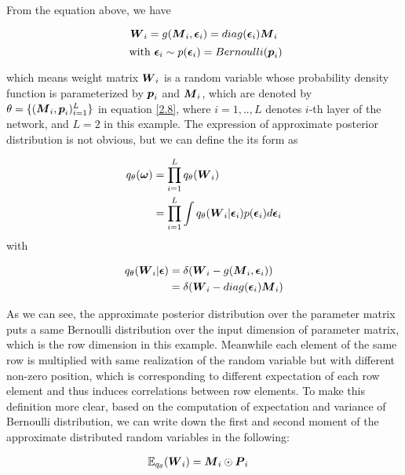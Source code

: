 From the equation above, we have 

\[
\boldsymbol W_{i} = g(\boldsymbol M_{i}, \boldsymbol \epsilon_{i})= diag(\boldsymbol \epsilon_{i}) \boldsymbol M_{i} 
\]
\[ 
\text{ with } \boldsymbol \epsilon_{i} \sim p(\boldsymbol \epsilon_{i}) = Bernoulli(\boldsymbol p_{i}) 
\]

which means weight matrix $\boldsymbol W_{i}$ is a random variable whose probability density function is parameterized by $\boldsymbol p_{i}$ and $\boldsymbol M_{i}$, which are denoted by $\theta = \{ (\boldsymbol M_{i}, \boldsymbol p_{i})_{i=1}^{L} \}$ in equation \ref{2.8}, where $i = {1,..,L}$ denotes $i$-th layer of the network, and $L = 2$ in this example. 
The expression of approximate posterior distribution is not obvious, but we can define the its form as 

\begin{equation}
\begin{aligned} \label{appro_dist_form}
q_{\theta}(\boldsymbol \omega) &= \prod_{i=1}^{L} q_{\theta}(\boldsymbol W_{i})\\
&= \prod_{i=1}^{L}\int q_{\theta}(\boldsymbol W_{i} | \boldsymbol \epsilon_{i})p(\boldsymbol \epsilon_{i}) d\boldsymbol \epsilon_{i} 
\end{aligned}
\end{equation}
with

\begin{equation}
\begin{aligned} \label{appro_cond_dist_form}
q_{\theta}(\boldsymbol W_{i}|\boldsymbol \epsilon) &= \delta(\boldsymbol W_{i} - g(\boldsymbol M_{i}, \boldsymbol \epsilon_{i}))  \\
& = \delta(\boldsymbol W_{i} - diag(\boldsymbol \epsilon_{i})\boldsymbol M_{i})
\end{aligned}
\end{equation}

As we can see, the approximate posterior distribution over the parameter matrix puts a same Bernoulli distribution over the input dimension of parameter matrix, which is the row dimension in this example.  Meanwhile each element of the same row is multiplied with same realization of the random variable but with different non-zero position, which is corresponding to different expectation of each row element and thus induces correlations between row elements. To make this definition more clear, based on the computation of expectation and variance of Bernoulli distribution, we can write down the first and second moment of the approximate distributed random variables in the following:

\begin{equation}
\begin{aligned} \label{appr_expectation}
\mathbb E_{q_{\theta}}(\boldsymbol W_{i}) & = \boldsymbol M_{i} \odot \boldsymbol P_{i}
\end{aligned}
\end{equation}

